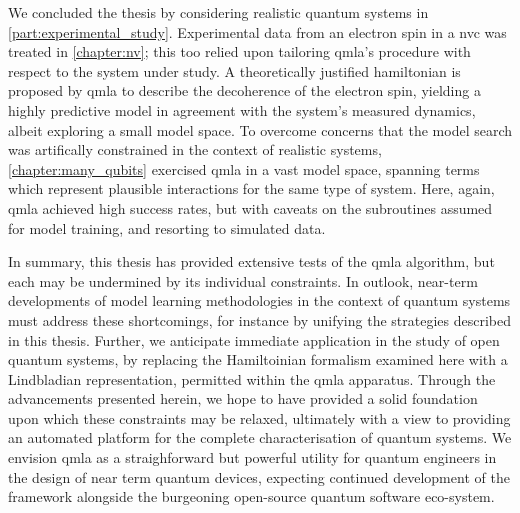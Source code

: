 \par 

We concluded the thesis by considering realistic quantum systems in \cref{part:experimental_study}. 
Experimental data from an electron spin in a \gls{nvc} was treated in \cref{chapter:nv};
    this too relied upon tailoring \gls{qmla}'s procedure with respect to the system under study.
A theoretically justified \gls{hamiltonian} is proposed by \gls{qmla} to describe the decoherence of the electron spin, 
    yielding a highly predictive model in agreement with the system's measured dynamics, 
    albeit exploring a small model space. 
To overcome concerns that the model search was artifically constrained in the context of realistic systems, 
    \cref{chapter:many_qubits} exercised \gls{qmla} in a vast model space, 
    spanning terms which represent plausible interactions for the same type of system. 
Here, again, \gls{qmla} achieved high success rates, but with caveats on the subroutines assumed for model training, 
    and resorting to simulated data. 
\par

In summary, this thesis has provided extensive tests of the \gls{qmla} algorithm, 
    but each may be undermined by its individual constraints. 
In outlook, near-term developments of model learning methodologies in the context of quantum systems
    must address these shortcomings, for instance by unifying the strategies described in this thesis. 
Further, we anticipate immediate application in the study of open quantum systems, 
    by replacing the Hamiltoinian formalism examined here with a Lindbladian representation, 
    permitted within the \gls{qmla} apparatus.    
Through the advancements presented herein, we hope to have provided a solid foundation upon which these constraints may be relaxed, 
    ultimately with a view to providing an automated platform for the complete characterisation of quantum systems.
We envision \gls{qmla} as a straighforward but powerful utility for quantum engineers in the design of near term quantum devices, 
    expecting continued development of the framework alongside the burgeoning open-source quantum software eco-system. 
\par


